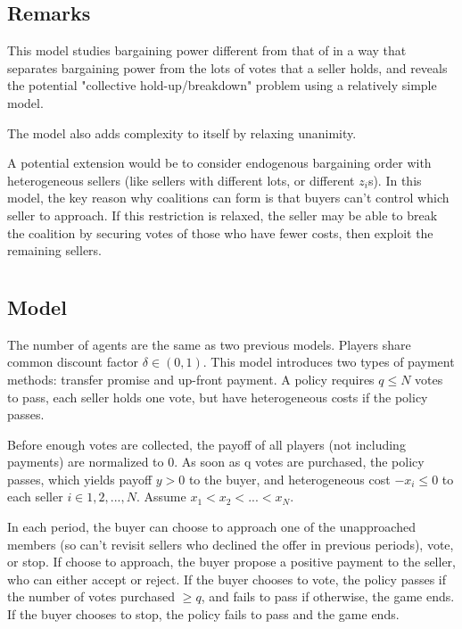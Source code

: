 \documentclass[ProjectGAZ]{subfiles}
\begin{document}
\subsection{Remarks}\label{subsec:InO-Remarks}

This model studies bargaining power different from that of \cite{Xiao} in a way that separates bargaining power from the lots of votes that a seller holds, and reveals the potential "collective hold-up/breakdown" problem using a relatively simple model. 

The model also adds complexity to itself by relaxing unanimity.

A potential extension would be to consider endogenous bargaining order with heterogeneous sellers (like sellers with different lots, or different $z_i$s). In this model, the key reason why coalitions can form is that buyers can't control which seller to approach. If this restriction is relaxed, the seller may be able to break the coalition by securing votes of those who have fewer costs, then exploit the remaining sellers.


\section{\cite{CnZSeqVB}}\label{subsec:CnZ}

\subsection{Model}\label{subsec:CnZ-model}

The number of agents are the same as two previous models. Players share common discount factor $\delta \in (0, 1)$. This model introduces two types of payment methods: transfer promise and up-front payment. A policy requires $q \leq N$ votes to pass, each seller holds one vote, but have heterogeneous costs if the policy passes.

Before enough votes are collected, the payoff of all players (not including payments) are normalized to 0. As soon as q votes are purchased, the policy passes, which yields payoff $y > 0$ to the buyer, and heterogeneous cost $-x_i \leq 0$ to each seller $i \in {1, 2, ..., N}$. Assume $x_1 < x_2 < ... <x_N$.
 
In each period, the buyer can choose to approach one of the unapproached members (so can't revisit sellers who declined the offer in previous periods), vote, or stop. If choose to approach, the buyer propose a positive payment to the seller, who can either accept or reject. If the buyer chooses to vote, the policy passes if the number of votes purchased $\geq q$, and fails to pass if otherwise, the game ends. If the buyer chooses to stop, the policy fails to pass and the game ends.
\end{document}
